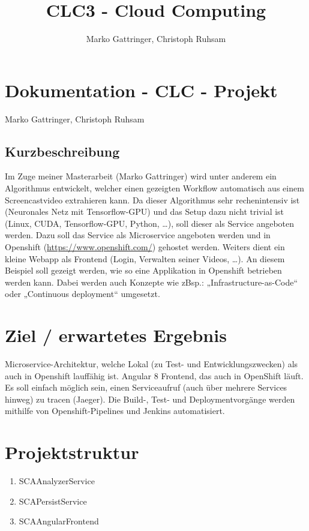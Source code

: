 \documentclass[11pt, a4paper, twoside]{article}   	%
\title{CLC3 - Cloud Computing}
\author{Marko Gattringer, Christoph Ruhsam}
\begin{document}
\setlength{\headheight}{15mm}

\section{Dokumentation - CLC - Projekt}
Marko Gattringer, Christoph Ruhsam

\subsection{Kurzbeschreibung}
Im Zuge meiner Masterarbeit (Marko Gattringer) wird unter anderem ein Algorithmus entwickelt, welcher einen gezeigten Workflow automatisch aus einem Screencastvideo extrahieren kann. Da dieser Algorithmus sehr rechenintensiv ist (Neuronales Netz mit Tensorflow-GPU) und das Setup dazu nicht trivial ist (Linux, CUDA, Tensorflow-GPU, Python, …), soll dieser als Service angeboten werden. Dazu soll das Service als Microservice angeboten werden und in Openshift (\href{https://www.openshift.com/}{https://www.openshift.com/}) gehostet werden. Weiters dient ein kleine Webapp als Frontend (Login, Verwalten seiner Videos, …). An diesem Beispiel soll gezeigt werden, wie so eine Applikation in Openshift betrieben werden kann. Dabei werden auch Konzepte wie zBsp.: „Infrastructure-as-Code“ oder „Continuous deployment“ umgesetzt.

\section{Ziel / erwartetes Ergebnis}
Microservice-Architektur, welche Lokal (zu Test- und Entwicklungszwecken) als auch in Openshift lauffähig ist.
Angular 8 Frontend, das auch in OpenShift läuft.
Es soll einfach möglich sein, einen Serviceaufruf (auch über mehrere Services hinweg) zu tracen (Jaeger).
Die Build-, Test- und Deploymentvorgänge werden mithilfe von Openshift-Pipelines und Jenkins automatisiert.

\section{Projektstruktur}
\begin{enumerate}
	\item SCAAnalyzerService
	
	\item SCAPersistService
	
	\item SCAAngularFrontend
	
\end{enumerate}
\end{document}

